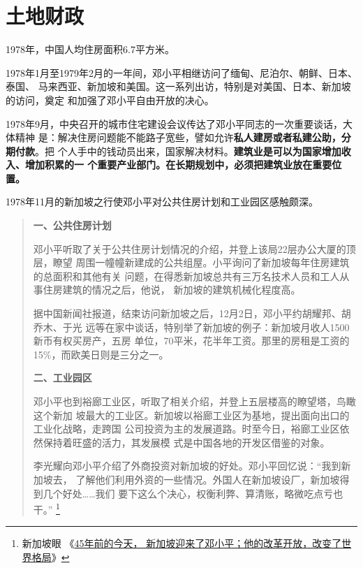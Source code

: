 \section{土地财政}
\label{sec:80tudi}

1978年，中国人均住房面积6.7平方米。

1978年1月至1979年2月的一年间，邓小平相继访问了缅甸、尼泊尔、朝鲜、日本、泰国、
马来西亚、新加坡和美国。这一系列出访，特别是对美国、日本、新加坡的访问，奠定
和加强了邓小平自由开放的决心。

1978年9月，中央召开的城市住宅建设会议传达了邓小平同志的一次重要谈话，大体精神
是：解决住房问题能不能路子宽些，譬如允许\textbf{私人建房或者私建公助，分期付款}。把
个人手中的钱动员出来，国家解决材料。\textbf{建筑业是可以为国家增加收入、增加积累的一
个重要产业部门。在长期规划中，必须把建筑业放在重要位置。}

1978年11月的新加坡之行使邓小平对公共住房计划和工业园区感触颇深。
\begin{quotation}
  \textbf{一、公共住房计划}

  邓小平听取了关于公共住房计划情况的介绍，并登上该局22层办公大厦的顶层，瞭望
  周围一幢幢新建成的公共组屋。小平询问了新加坡每年住房建筑的总面积和其他有关
  问题，在得悉新加坡总共有三万名技术人员和工人从事住房建筑的情况之后，他说，
  新加坡的建筑机械化程度高。

  据中国新闻社报道，结束访问新加坡之后，12月2日，邓小平约胡耀邦、胡乔木、于光
  远等在家中谈话，特别举了新加坡的例子：新加坡月收人1500新币有权买房产，五房
  单位，70平米，花半年工资。那里的房租是工资的15\%，而欧美日则是三分之一。

  \textbf{二、工业园区}

  邓小平也到裕廊工业区，听取了相关介绍，并登上五层楼高的瞭望塔，鸟瞰这个新加
  坡最大的工业区。新加坡以裕廊工业区为基地，提出面向出口的工业化战略，走跨国
  公司投资为主的发展道路。时至今日，裕廊工业区依然保持着旺盛的活力，其发展模
  式是中国各地的开发区借鉴的对象。

  李光耀向邓小平介绍了外商投资对新加坡的好处。邓小平回忆说：“我到新加坡去，
  了解他们利用外资的一些情况。外国人在新加坡设厂，新加坡得到几个好处……我们
  要下这么个决心，权衡利弊、算清账，略微吃点亏也干。” \footnote{新加坡眼
    《\href{https://www.yan.sg/gaibianeshijiegejucbxiaopige/}{45年前的今天，
      新加坡迎来了邓小平；他的改革开放，改变了世界格局}》}
\end{quotation}

